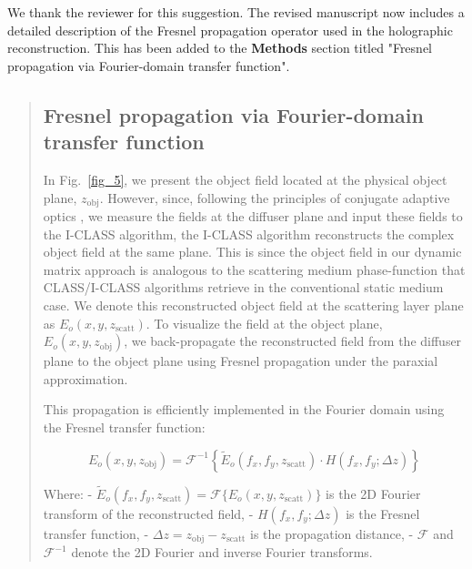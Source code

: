 \documentclass[12pt]{article}
\newenvironment{ourresponse}
    {\begin{tcolorbox}[width=\linewidth,breakable,enhanced,colback=gray!5,colframe=responsecolor!50,title=Response,left=5pt,right=5pt]}
    {\end{tcolorbox}}
\begin{document}
\begin{ourresponse}
    We thank the reviewer for this suggestion. The revised manuscript now includes a detailed description of the Fresnel propagation operator used in the holographic reconstruction. This has been added to the \textbf{Methods} section titled "Fresnel propagation via Fourier-domain transfer function".
    \begin{quote}
        \subsection*{Fresnel propagation via Fourier-domain transfer function}
        \label{Fresnel_propagation}
        In Fig.~\ref{fig_5}, we present the object field located at the physical object plane, $z_{\text{obj}}$. However, since, following the principles of conjugate adaptive optics \cite{mertz2015field, kwon2023computational, sunray2024beyond, Katz2012looking}, we measure the fields at the diffuser plane and input these fields to the I-CLASS algorithm, the I-CLASS algorithm reconstructs the complex object field at the same plane. This is since the object field in our dynamic matrix approach is analogous to the scattering medium phase-function that CLASS/I-CLASS algorithms retrieve in the conventional static medium case. We denote this reconstructed object field at the scattering layer plane as  $E_o(x, y, z_{\text{scatt}})$. To visualize the field at the object plane, $E_o(x, y, z_{\text{obj}}) $, we back-propagate the reconstructed field from the diffuser plane to the object plane using Fresnel propagation under the paraxial approximation.
        
        This propagation is efficiently implemented in the Fourier domain using the Fresnel transfer function:
        
        \begin{equation}
            E_o(x, y, z_{\text{obj}}) = \mathcal{F}^{-1} \left\{ \tilde{E}_o(f_x, f_y, z_{\text{scatt}}) \cdot H(f_x, f_y; \Delta z) \right\}
        \end{equation}
        
        Where:
        - $ \tilde{E}_o(f_x, f_y, z_{\text{scatt}}) = \mathcal{F}\{ E_o(x, y, z_{\text{scatt}}) \} $ is the 2D Fourier transform of the reconstructed field,
        - $ H(f_x, f_y; \Delta z) $ is the Fresnel transfer function,
        - $ \Delta z = z_{\text{obj}} - z_{\text{scatt}} $ is the propagation distance,
        - $ \mathcal{F} $ and $ \mathcal{F}^{-1} $ denote the 2D Fourier and inverse Fourier transforms.
        

\end{quote}
\end{ourresponse}
\end{document}
